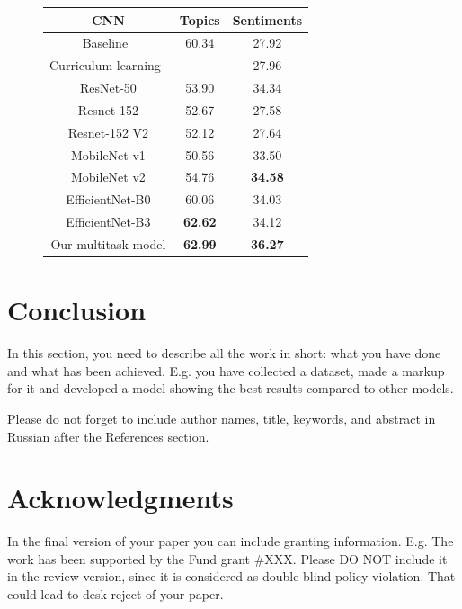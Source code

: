 \documentclass{zapiski}
\begin{document}
\begin{figure}[!tbh]
    \footnotesize\setlength{\tabcolsep}{2.8pt}
    \begin{tabular}{|c|c|c|}
    \hline
        CNN & Topics & Sentiments \\
        \hline
        Baseline~\cite{hussain2017automatic} & 60.34& 27.92\\
        Curriculum learning~\cite{10.1007/978-3-030-01216-8_36} & --- & 27.96\\
        \hline
        ResNet-50 & 53.90 & 34.34 \\
        Resnet-152 & 52.67 & 27.58 \\
        Resnet-152 V2 & 52.12 & 27.64 \\
        MobileNet v1& 50.56 & 33.50\\
        MobileNet v2 & 54.76  & \textbf{34.58}\\
        EfficientNet-B0 & 60.06 & 34.03\\
        EfficientNet-B3 & \textbf{62.62} & 34.12 \\
        \hline
        Our multitask model & \textbf{62.99} & \textbf{36.27} \\ \hline
    \end{tabular}
    \label{tab:topics_sentiments_overall_accuracy}
\end{figure}

\section{Conclusion}
In this section, you need to describe all the work in short: what you have done and what has been achieved. E.g. you have collected a dataset, made a markup for it and developed a model showing the best results compared to other models. 

Please do not forget to include author names, title, keywords, and abstract in Russian after the References section.

\section*{Acknowledgments}
In the final version of your paper you can include granting information. E.g. The work has been supported by the Fund grant \#XXX. Please DO NOT include it in the review version, since it is considered as double blind policy violation. That could lead to desk reject of your paper.
\end{document}
